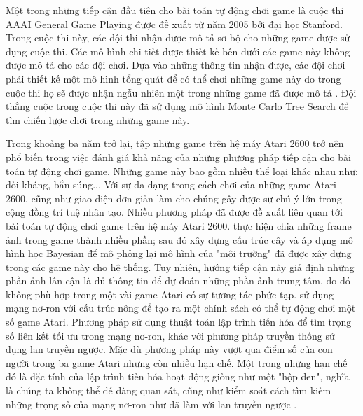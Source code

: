 Một trong những tiếp cận đầu tiên cho bài toán tự động chơi game là cuộc thi AAAI General Game Playing được đề xuất từ năm 2005 bởi đại học Stanford. Trong cuộc thi này, các đội thi nhận được mô tả sơ bộ cho những game được sử dụng cuộc thi. Các mô hình chi tiết được thiết kế bên dưới các game này không được mô tả cho các đội chơi. Dựa vào những thông tin nhận được, các đội chơi phải thiết kế một mô hình tổng quát để có thể chơi những game này do trong cuộc thi họ sẽ được nhận ngẫu nhiên một trong những game đã được mô tả \cite{genesereth2005general}. Đội thắng cuộc trong cuộc thi này đã sử dụng mô hình Monte Carlo Tree Search để tìm chiến lược chơi trong những game này.

Trong khoảng ba năm trở lại, tập những game trên hệ máy Atari 2600 trở nên phổ biến trong việc đánh giá khả năng của những phương pháp tiếp cận cho bài toán tự động chơi game. Những game này bao gồm nhiều thể loại khác nhau như: đối kháng, bắn súng... Với sự đa dạng trong cách chơi của những game Atari 2600, cũng như giao diện đơn giản làm cho chúng gây được sự chú ý lớn trong cộng đồng trí tuệ nhân tạo. Nhiều phương pháp đã được đề xuất liên quan tới bài toán tự động chơi game trên hệ máy Atari 2600. \cite{bellemare2013bayesian,icml2014c2_bellemare14} thực hiện chia những frame ảnh trong game thành nhiều phần; sau đó xây dựng cấu trúc cây  và áp dụng mô hình học Bayesian để mô phỏng lại mô hình của "môi trường" đã được xây dựng trong các game này cho hệ thống. Tuy nhiên, hướng tiếp cận này giả định những phần ảnh lân cận là đủ thông tin để dự đoán những phần ảnh trung tâm, do đó không phù hợp trong một vài game Atari có sự tương tác phức tạp. \cite{hausknecht2014neuroevolution} sử dụng mạng nơ-ron với cấu trúc nông để tạo ra một chính sách có thể tự động chơi một số game Atari. Phương pháp sử dụng thuật toán lập trình tiến hóa để tìm trọng số liên kết tối ưu trong mạng nơ-ron, khác với phương pháp truyền thống sử dụng lan truyền ngược. Mặc dù phương pháp này vượt qua điểm số của con người trong ba game Atari nhưng còn nhiều hạn chế. Một trong những hạn chế đó là đặc tính của lập trình tiến hóa hoạt động giống như một "hộp đen", nghĩa là chúng ta không thể dễ dàng quan sát, cũng như kiểm soát cách tìm kiếm những trọng số của mạng nơ-ron như đã làm với lan truyền ngược \cite{risi2014neuroevolution}.

